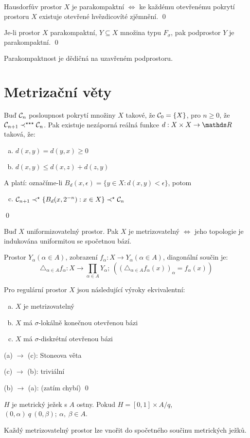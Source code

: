 \documentclass[12pt,a4paper]{article}
\newcommand{\head}[1]{\medskip\noindent {\bf #1}}
\begin{document}
\veta Hausdorfův prostor $X$ je parakompaktní $\iff$ ke každému otevřenému
	pokrytí prostoru $X$ existuje otevřené hvězdicovíté zjěmnění.
\dukaz \qed

\veta Je-li prostor $X$ parakompaktní, $Y \subseteq X$ množina typu $F_\sigma$,
	pak podprostor $Y$ je parakompaktní.
\dukaz \qed

\head {Důsledek:} Parakompaktnost je dědičná na uzavřeném podprostoru.

\section{Metrizační věty}
\lemma Buď $\mathcal{ C }_n$ posloupnost pokrytí množiny $X$ takové, že $\mathcal{ C }_0 =
	\{X\}$, pro $n \geq 0$, že $\mathcal{ C }_{n+1} \prec^{\star\star\star} \mathcal{ C }_n$. Pak
	existuje nezáporná reálná funkce $d : X \times X \to \m R$ taková, že:

	\begin{enumerate}[(a)]
		\item $d(x,y) = d(y,x) \geq 0$
		\item $d(x,y) \leq d(x,z) + d(z,y)$
	\end{enumerate}
	A platí: označíme-li $B_d(x,\epsilon) = \{y \in X : d(x,y) < \epsilon \}$, potom
	\begin{enumerate}[(a)]
		\setcounter{enumi}{2}
		\item $\mathcal{ C }_{n+1} \prec^{\star} \{ B_d(x,2^{-n}) : x \in X\} \prec^{\star} \mathcal{ C }_n$
	\end{enumerate}
\dukaz \qed

\veta [P. S. Uryshon] Buď $X$ uniformizovatelný prostor. Pak $X$ je
	metrizovatelný $\iff$ jeho topologie je indukována uniformitou se spočetnou
	bází.

	Prostor $Y_\alpha (\alpha \in A)$, zobrazení $f_\alpha : X \to Y_\alpha (\alpha \in A)$,
	diagonální součin je:
		$$\triangle_{\alpha \in A} f_\alpha : X \to \prod_{\alpha \in A} Y_\alpha;~((\triangle_{\alpha \in A} f_\alpha(x))_\alpha = f_\alpha(x))$$

 Pro regulární prostor $X$ jsou následující výroky
	ekvivalentní:
	\begin{enumerate}[(a)]
		\item $X$ je metrizovatelný
		\item $X$ má $\sigma$-lokálně konečnou otevřenou bázi
		\item $X$ má $\sigma$-diskrétní otevřenou bázi
	\end{enumerate}
\dukaz (a) $\rightarrow$ (c): Stoneova věta

(c) $\rightarrow$ (b): triviální

(b) $\rightarrow$ (a): (zatím chybí)
\qed

 $H$ je metrický ježek s $A$ ostny. Pokud $H = [0,1] \times A / q$, $(0, \alpha)~q~(0, \beta);~\alpha,~\beta \in A$.

\head {Důsledek:}
	Každý metrizovatelný prostor lze vnořit do spočetného součinu metrických
	ježků.
\end{document}
